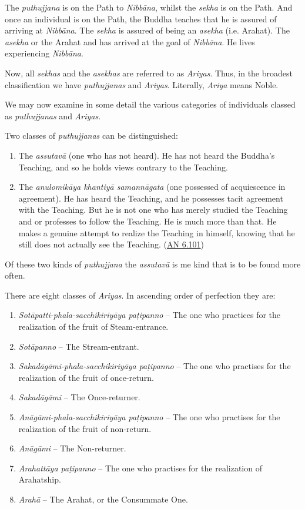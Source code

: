 The \emph{puthujjana} is  on the Path to \emph{Nibbāna}, whilst the \emph{sekha} is on the Path. And once an individual is on the Path, the Buddha teaches that he is assured of arriving at \emph{Nibbāna}. The \emph{sekha} is assured of being an \emph{asekha} (i.e. Arahat). The \emph{asekha} or the Arahat  and has arrived at the goal of \emph{Nibbāna}. He lives experiencing \emph{Nibbāna}.

Now, all \emph{sekhas} and the \emph{asekhas} are referred to as \emph{Ariyas}. Thus, in the broadest classification we have \emph{puthujjanas} and \emph{Ariyas}. Literally, \emph{Ariya} means Noble.

We may now examine in some detail the various categories of individuals classed as \emph{puthujjanas} and \emph{Ariyas}.

Two classes of \emph{puthujjanas} can be distinguished:

\begin{enumerate}
\def\labelenumi{\arabic{enumi}.}
\item
  The \emph{assutavā} (one who has not heard). He has not heard the Buddha's Teaching, and so he holds views contrary to the Teaching.
\item
  The \emph{anulomikāya khantiyā samannāgata} (one possessed of acquiescence in agreement). He has heard the Teaching, and he possesses tacit agreement with the Teaching. But he is not one who has merely studied the Teaching and or professes to follow the Teaching. He is much more than that. He makes a genuine attempt to realize the Teaching in himself, knowing that he still does not actually see the Teaching. (\href{https://suttacentral.net/an6.101/en/sujato}{AN 6.101})
\end{enumerate}

Of these two kinds of \emph{puthujjana} the \emph{assutavā} is me kind that is to be found more often.

\clearpage

There are eight classes of \emph{Ariyas}. In ascending order of perfection they are:

\begin{enumerate}
\def\labelenumi{\arabic{enumi}.}
\item
  \emph{Sotāpatti-phala-sacchikiriyāya paṭipanno} -- The one who practices for the realization of the fruit of Steam-entrance.
\item
  \emph{Sotāpanno} -- The Stream-entrant.
\item
  \emph{Sakadāgāmi-phala-sacchikiriyāya paṭipanno} -- The one who practises for the realization of the fruit of once-return.
\item
  \emph{Sakadāgāmi} -- The Once-returner.
\item
  \emph{Anāgāmi-phala-sacchikiriyāya paṭipanno} -- The one who practises for the realization of the fruit of non-return.
\item
  \emph{Anāgāmi} -- The Non-returner.
\item
  \emph{Arahattāya paṭipanno} -- The one who practises for the realization of Arahatship.
\item
  \emph{Arahā} -- The Arahat, or the Consummate One.
\end{enumerate}

